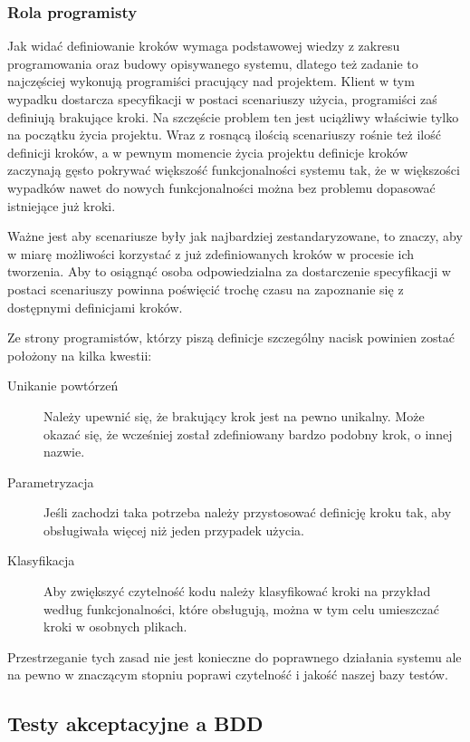     \subsubsection{Rola programisty}
    
      Jak widać definiowanie kroków wymaga podstawowej wiedzy z zakresu programowania oraz budowy opisywanego systemu, dlatego też zadanie to najczęściej wykonują programiści pracujący nad projektem.  Klient w tym wypadku dostarcza specyfikacji w postaci scenariuszy użycia, programiści zaś definiują brakujące kroki. Na szczęście problem ten jest uciążliwy właściwie tylko na początku życia projektu. Wraz z rosnącą ilością scenariuszy rośnie też ilość definicji kroków, a w pewnym momencie życia projektu definicje kroków zaczynają gęsto pokrywać większość funkcjonalności systemu tak, że w większości wypadków nawet do nowych funkcjonalności można bez problemu dopasować istniejące już kroki.
      
      Ważne jest aby scenariusze były jak najbardziej zestandaryzowane, to znaczy, aby w miarę możliwości korzystać z już zdefiniowanych kroków w procesie ich tworzenia. Aby to osiągnąć osoba odpowiedzialna  za dostarczenie specyfikacji w postaci scenariuszy powinna poświęcić trochę czasu na zapoznanie się z dostępnymi definicjami kroków.
      
      Ze strony programistów, którzy piszą definicje szczególny nacisk powinien zostać położony na kilka kwestii:
      
      \begin{description}
        \item[Unikanie powtórzeń] Należy upewnić się, że brakujący krok jest na pewno unikalny. Może okazać się, że wcześniej został zdefiniowany bardzo podobny krok, o innej nazwie.
        \item[Parametryzacja] Jeśli zachodzi taka potrzeba należy przystosować definicję kroku tak, aby obsługiwała więcej niż jeden przypadek użycia.
        \item[Klasyfikacja] Aby zwiększyć czytelność kodu należy klasyfikować kroki na przykład według funkcjonalności, które obsługują, można w tym celu umieszczać kroki w osobnych plikach.
      \end{description}
      
      Przestrzeganie tych zasad nie jest konieczne do poprawnego działania systemu ale na pewno w znaczącym stopniu poprawi czytelność i jakość naszej bazy testów.
      
    \subsection{Testy akceptacyjne a BDD}
      
